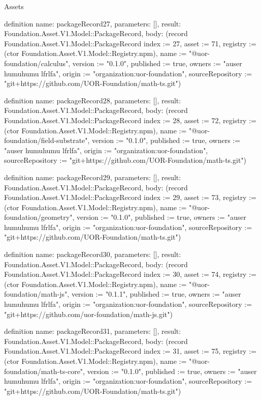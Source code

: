 \begin{lexlean}{Assets}
\begin{semanticmodule}
definition{
  name: packageRecord27,
  parameters: [],
  result: Foundation.Asset.V1.Model::PackageRecord,
  body: (record Foundation.Asset.V1.Model::PackageRecord {index := 27, asset := 71, registry := (ctor Foundation.Asset.V1.Model::Registry.npm), name := "@uor-foundation/calculus", version := "0.1.0", published := true, owners := "auser humuhumu lfrlfa", origin := "organization:uor-foundation", sourceRepository := "git+https://github.com/UOR-Foundation/math-ts.git"})
}

definition{
  name: packageRecord28,
  parameters: [],
  result: Foundation.Asset.V1.Model::PackageRecord,
  body: (record Foundation.Asset.V1.Model::PackageRecord {index := 28, asset := 72, registry := (ctor Foundation.Asset.V1.Model::Registry.npm), name := "@uor-foundation/field-substrate", version := "0.1.0", published := true, owners := "auser humuhumu lfrlfa", origin := "organization:uor-foundation", sourceRepository := "git+https://github.com/UOR-Foundation/math-ts.git"})
}

definition{
  name: packageRecord29,
  parameters: [],
  result: Foundation.Asset.V1.Model::PackageRecord,
  body: (record Foundation.Asset.V1.Model::PackageRecord {index := 29, asset := 73, registry := (ctor Foundation.Asset.V1.Model::Registry.npm), name := "@uor-foundation/geometry", version := "0.1.0", published := true, owners := "auser humuhumu lfrlfa", origin := "organization:uor-foundation", sourceRepository := "git+https://github.com/UOR-Foundation/math-ts.git"})
}

definition{
  name: packageRecord30,
  parameters: [],
  result: Foundation.Asset.V1.Model::PackageRecord,
  body: (record Foundation.Asset.V1.Model::PackageRecord {index := 30, asset := 74, registry := (ctor Foundation.Asset.V1.Model::Registry.npm), name := "@uor-foundation/math-js", version := "0.1.1", published := true, owners := "auser humuhumu lfrlfa", origin := "organization:uor-foundation", sourceRepository := "git+https://github.com/uor-foundation/math-js.git"})
}

definition{
  name: packageRecord31,
  parameters: [],
  result: Foundation.Asset.V1.Model::PackageRecord,
  body: (record Foundation.Asset.V1.Model::PackageRecord {index := 31, asset := 75, registry := (ctor Foundation.Asset.V1.Model::Registry.npm), name := "@uor-foundation/math-ts-core", version := "0.1.0", published := true, owners := "auser humuhumu lfrlfa", origin := "organization:uor-foundation", sourceRepository := "git+https://github.com/UOR-Foundation/math-ts.git"})
}


\end{semanticmodule}
\end{lexlean}
